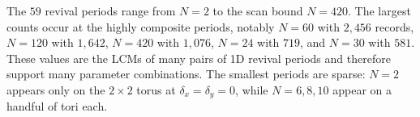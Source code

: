 The $59$ revival periods range from $N = 2$ to the scan bound
$N = 420$. The largest counts occur at the highly composite
periods, notably $N = 60$ with $2{,}456$ records, $N = 120$ with
$1{,}642$, $N = 420$ with $1{,}076$, $N = 24$ with $719$, and
$N = 30$ with $581$. These values are the LCMs of many pairs of
1D revival periods and therefore support many parameter
combinations. The smallest periods are sparse: $N = 2$ appears
only on the $2 \times 2$ torus at $\delta_x = \delta_y = 0$, while
$N = 6, 8, 10$ appear on a handful of tori each.
